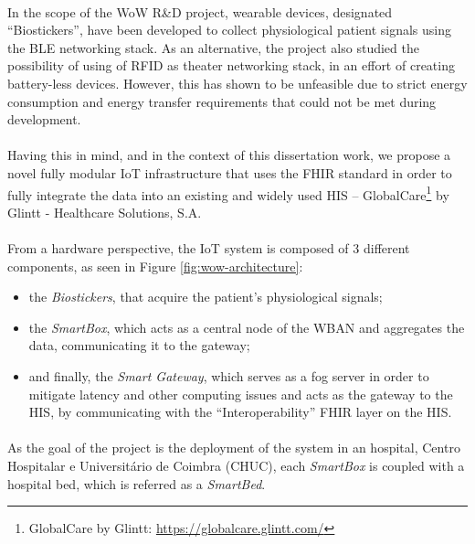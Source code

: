 \paragraph{} In the scope of the \acs{WoW} R\&D project, wearable devices, designated ``Biostickers'', have been developed to collect physiological patient signals using the \acs{BLE} networking stack. As an alternative, the project also studied the possibility of using of \acs{RFID} as theater networking stack, in an effort of creating battery-less devices. However, this has shown to be unfeasible due to strict energy consumption and energy transfer requirements that could not be met during development. 

\paragraph{} Having this in mind, and in the context of this dissertation work, we propose a novel fully modular \acs{IoT} infrastructure that uses the \acs{FHIR} standard in order to fully integrate the data into an existing and widely used \acs{HIS} -- GlobalCare\footnote{GlobalCare by Glintt: \url{https://globalcare.glintt.com/}} by Glintt - Healthcare Solutions, S.A. 

\paragraph{} From a hardware perspective, the \acs{IoT} system is composed of 3 different components, as seen in Figure \ref{fig:wow-architecture}:
\begin{itemize}
    \item the \textit{Biostickers}, that acquire the patient's physiological signals;
    \item the \textit{SmartBox}, which acts as a central node of the \acs{WBAN} and aggregates the data, communicating it to the gateway;
    \item and finally, the \textit{Smart Gateway}, which serves as a fog server in order to mitigate latency and other computing issues and acts as the gateway to the \acs{HIS}, by communicating with the ``Interoperability'' \acs{FHIR} layer on the \acs{HIS}.
\end{itemize}

\paragraph{} As the goal of the project is the deployment of the system in an hospital, Centro Hospitalar e Universitário de Coimbra (CHUC), each \textit{SmartBox} is coupled with a hospital bed, which is referred as a \textit{SmartBed}.

